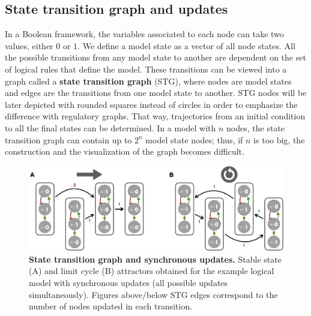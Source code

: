 \documentclass[a4paper,12pt,twoside,onecolumn,openright,final,oldfontcommands]{memoir}
\begin{document}
\subsection{State transition graph and
updates}\label{state-transition-graph-and-updates}

In a Boolean framework, the variables associated to each node can take
two values, either \(0\) or \(1\). We define a model state as a vector
of all node states. All the possible transitions from any model state to
another are dependent on the set of logical rules that define the model.
These transitions can be viewed into a graph called a \textbf{state
transition graph} (STG), where nodes are model states and edges are the
transitions from one model state to another. STG nodes will be later
depicted with rounded squares instead of circles in order to emphasize
the difference with regulatory graphs. That way, trajectories from an
initial condition to all the final states can be determined. In a model
with \(n\) nodes, the state transition graph can contain up to \(2^n\)
model state nodes; thus, if \(n\) is too big, the construction and the
visualization of the graph becomes difficult.

\begin{figure}

{\centering \includegraphics[width=0.9\linewidth]{fig/synchronous} 

}

\caption[A simple example of a logical model]{\textbf{State transition graph and synchronous
updates.} Stable state (A) and limit cycle (B) attractors obtained for
the example logical model with synchronous updates (all possible updates
simultaneously). Figures above/below STG edges correspond to the number
of nodes updated in each transition.}\label{fig:synchronous}
\end{figure}
\end{document}
